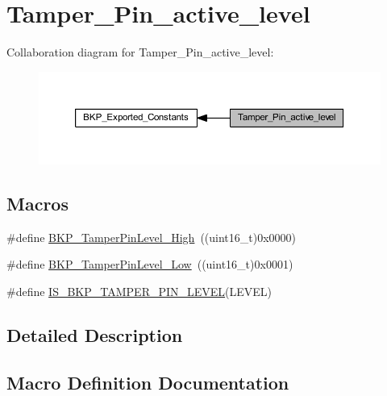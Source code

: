 \hypertarget{group___tamper___pin__active__level}{}\section{Tamper\+\_\+\+Pin\+\_\+active\+\_\+level}
\label{group___tamper___pin__active__level}
Collaboration diagram for Tamper\+\_\+\+Pin\+\_\+active\+\_\+level\+:
\nopagebreak
\begin{figure}[H]
\begin{center}
\leavevmode
\includegraphics[width=350pt]{group___tamper___pin__active__level}
\end{center}
\end{figure}
\subsection*{Macros}
\begin{DoxyCompactItemize}
\item 
\#define \hyperlink{group___tamper___pin__active__level_gae7203c3c0202cd68d201278c8be2b967}{B\+K\+P\+\_\+\+Tamper\+Pin\+Level\+\_\+\+High}~((uint16\+\_\+t)0x0000)
\item 
\#define \hyperlink{group___tamper___pin__active__level_gade9fc51f494eddcc4d88679c80fe39ce}{B\+K\+P\+\_\+\+Tamper\+Pin\+Level\+\_\+\+Low}~((uint16\+\_\+t)0x0001)
\item 
\#define \hyperlink{group___tamper___pin__active__level_gae7cd3bd314605f7752062c814b850c23}{I\+S\+\_\+\+B\+K\+P\+\_\+\+T\+A\+M\+P\+E\+R\+\_\+\+P\+I\+N\+\_\+\+L\+E\+V\+EL}(L\+E\+V\+EL)
\end{DoxyCompactItemize}


\subsection{Detailed Description}


\subsection{Macro Definition Documentation}
\mbox{\label{group___tamper___pin__active__level_gae7203c3c0202cd68d201278c8be2b967}} 
